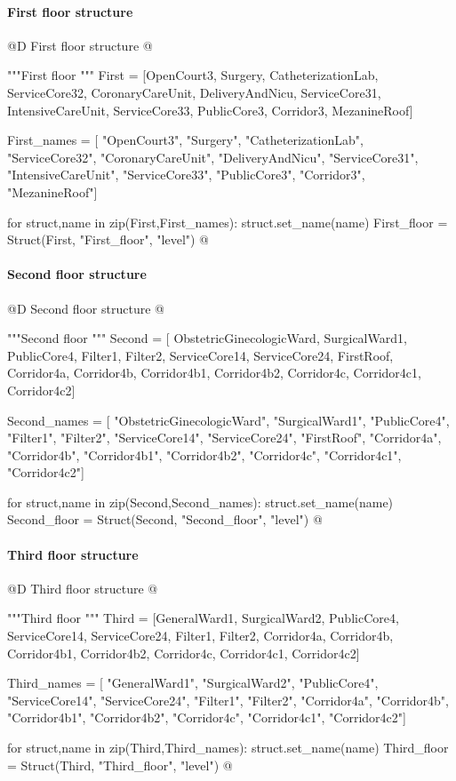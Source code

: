 \documentclass[11pt,oneside]{article}    %
\begin{document}
\paragraph{First floor structure}
@D First floor structure
@{"""First floor """
First = [OpenCourt3, Surgery, CatheterizationLab,
    ServiceCore32,  CoronaryCareUnit, DeliveryAndNicu, ServiceCore31,
    IntensiveCareUnit, ServiceCore33, PublicCore3, Corridor3, MezanineRoof]

First_names = [ "OpenCourt3", "Surgery", "CatheterizationLab",
    "ServiceCore32", "CoronaryCareUnit", "DeliveryAndNicu", "ServiceCore31",
    "IntensiveCareUnit", "ServiceCore33", "PublicCore3", "Corridor3", "MezanineRoof"]

for struct,name in zip(First,First_names): struct.set_name(name)
First_floor = Struct(First, "First_floor", "level")
@}

\paragraph{Second floor structure}
@D Second floor structure
@{"""Second floor """
Second = [ ObstetricGinecologicWard, SurgicalWard1,
    PublicCore4, Filter1, Filter2,
    ServiceCore14, ServiceCore24, FirstRoof,  Corridor4a, Corridor4b,
    Corridor4b1, Corridor4b2, Corridor4c, Corridor4c1, Corridor4c2]

Second_names = [ "ObstetricGinecologicWard", "SurgicalWard1",
    "PublicCore4", "Filter1", "Filter2",
    "ServiceCore14", "ServiceCore24", "FirstRoof", "Corridor4a", "Corridor4b",
    "Corridor4b1", "Corridor4b2", "Corridor4c", "Corridor4c1", "Corridor4c2"]

for struct,name in zip(Second,Second_names): struct.set_name(name)
Second_floor = Struct(Second, "Second_floor", "level")
@}

\paragraph{Third floor structure}
@D Third floor structure
@{"""Third floor """
Third = [GeneralWard1, SurgicalWard2, PublicCore4, ServiceCore14, ServiceCore24,
    Filter1, Filter2, Corridor4a, Corridor4b, Corridor4b1, Corridor4b2, Corridor4c,
    Corridor4c1, Corridor4c2]

Third_names = [ "GeneralWard1", "SurgicalWard2", "PublicCore4", "ServiceCore14", 
	"ServiceCore24", "Filter1", "Filter2", "Corridor4a", "Corridor4b", "Corridor4b1", 
	"Corridor4b2", "Corridor4c", "Corridor4c1", "Corridor4c2"]

for struct,name in zip(Third,Third_names): struct.set_name(name)
Third_floor = Struct(Third, "Third_floor", "level")
@}
\end{document}
